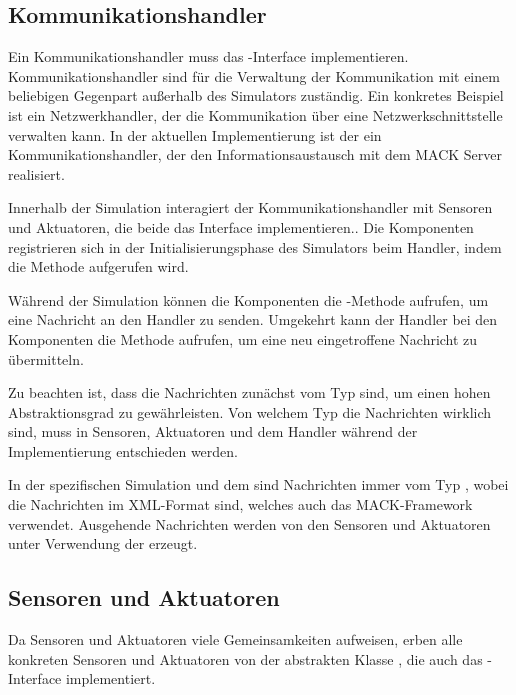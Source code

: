 \subsection{Kommunikationshandler}\label{subsec:concept_communication}
Ein Kommunikationshandler muss das -Interface implementieren. Kommunikationshandler sind für die Verwaltung der Kommunikation mit einem beliebigen Gegenpart außerhalb des Simulators zuständig. Ein konkretes Beispiel ist ein Netzwerkhandler, der die Kommunikation über eine Netzwerkschnittstelle verwalten kann. In der aktuellen Implementierung ist der  ein Kommunikationshandler, der den Informationsaustausch mit dem MACK Server realisiert.

Innerhalb der Simulation interagiert der Kommunikationshandler mit Sensoren und Aktuatoren, die beide das Interface  implementieren.. Die Komponenten registrieren sich in der Initialisierungsphase des Simulators beim Handler, indem die Methode  aufgerufen wird.

Während der Simulation können die Komponenten die -Methode aufrufen, um eine Nachricht an den Handler zu senden. Umgekehrt kann der Handler bei den Komponenten die Methode  aufrufen, um eine neu eingetroffene Nachricht zu übermitteln.

Zu beachten ist, dass die Nachrichten zunächst vom Typ  sind, um einen hohen Abstraktionsgrad zu gewährleisten. Von welchem Typ die Nachrichten wirklich sind, muss in Sensoren, Aktuatoren und dem Handler während der Implementierung entschieden werden.

In der spezifischen Simulation und dem  sind Nachrichten immer vom Typ , wobei die Nachrichten im XML-Format sind, welches auch das MACK-Framework verwendet. Ausgehende Nachrichten werden von den Sensoren und Aktuatoren unter Verwendung der  erzeugt.


\subsection{Sensoren und Aktuatoren}\label{subsec:concept_actuators_sensors}
Da Sensoren und Aktuatoren viele Gemeinsamkeiten aufweisen, erben alle konkreten Sensoren und Aktuatoren von der abstrakten Klasse , die auch das -Interface implementiert.

